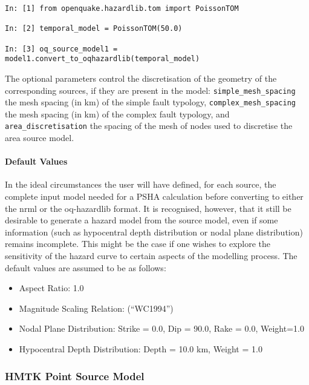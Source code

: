 \begin{Verbatim}[frame=single, commandchars=\\\{\}, fontsize=\scriptsize, samepage=true]
In: [1] from openquake.hazardlib.tom import PoissonTOM

In: [2] temporal_model = PoissonTOM(50.0)

In: [3] oq_source_model1 = model1.convert_to_oqhazardlib(temporal_model)
\end{Verbatim}

The optional parameters control the discretisation of the geometry of the corresponding sources, if they are present in the model: \verb=simple_mesh_spacing= the mesh spacing (in km) of the simple fault typology, \verb=complex_mesh_spacing= the mesh spacing (in km) of the complex fault typology, and \verb=area_discretisation= the spacing of the mesh of nodes used to discretise the area source model.

\paragraph{Default Values}

In the ideal circumstances the user will have defined, for each source, the complete input model needed for a PSHA calculation before converting to either the nrml or the oq-hazardlib format. It is recognised, however, that it still be desirable to generate a hazard model from the source model, even if some information (such as hypocentral depth distribution or nodal plane distribution) remains incomplete. This might be the case if one wishes to explore the sensitivity of the hazard curve to certain aspects of the modelling process. The default values are assumed to be as follows:

\begin{itemize}
\item Aspect Ratio: 1.0
\item Magnitude Scaling Relation: \cite{wells1994} (``WC1994'')
\item Nodal Plane Distribution: Strike = 0.0, Dip = 90.0, Rake = 0.0, Weight=1.0
\item Hypocentral Depth Distribution: Depth = 10.0 km, Weight = 1.0
\end{itemize}

\subsubsection{HMTK Point Source Model}

